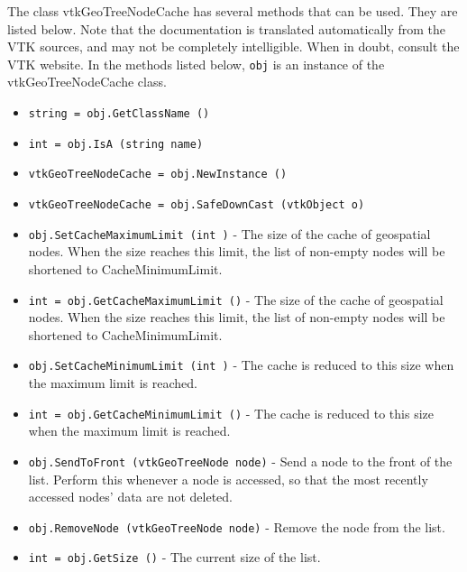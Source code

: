 The class vtkGeoTreeNodeCache has several methods that can be used.
  They are listed below.
Note that the documentation is translated automatically from the VTK sources,
and may not be completely intelligible.  When in doubt, consult the VTK website.
In the methods listed below, \verb|obj| is an instance of the vtkGeoTreeNodeCache class.
\begin{itemize}
\item  \verb|string = obj.GetClassName ()|

\item  \verb|int = obj.IsA (string name)|

\item  \verb|vtkGeoTreeNodeCache = obj.NewInstance ()|

\item  \verb|vtkGeoTreeNodeCache = obj.SafeDownCast (vtkObject o)|

\item  \verb|obj.SetCacheMaximumLimit (int )| -  The size of the cache of geospatial nodes.
 When the size reaches this limit, the list of non-empty
 nodes will be shortened to CacheMinimumLimit.

\item  \verb|int = obj.GetCacheMaximumLimit ()| -  The size of the cache of geospatial nodes.
 When the size reaches this limit, the list of non-empty
 nodes will be shortened to CacheMinimumLimit.

\item  \verb|obj.SetCacheMinimumLimit (int )| -  The cache is reduced to this size when the maximum limit is reached.

\item  \verb|int = obj.GetCacheMinimumLimit ()| -  The cache is reduced to this size when the maximum limit is reached.

\item  \verb|obj.SendToFront (vtkGeoTreeNode node)| -  Send a node to the front of the list.
 Perform this whenever a node is accessed, so that the most
 recently accessed nodes' data are not deleted.

\item  \verb|obj.RemoveNode (vtkGeoTreeNode node)| -  Remove the node from the list.

\item  \verb|int = obj.GetSize ()| -  The current size of the list.

\end{itemize}
